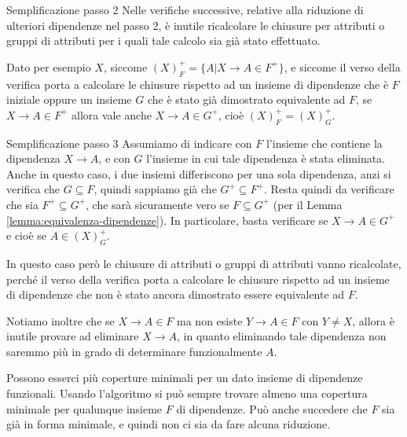 \begin{Osservation}{Semplificazione passo 2}{}
    Nelle verifiche successive, relative alla riduzione di ulteriori dipendenze nel passo 2, è inutile ricalcolare le chiusure per attributi o gruppi di attributi per i quali tale calcolo sia già stato effettuato.

    Dato per esempio $X$, siccome $(X)^+_F = \{ A | X\to A \in F^+\}$, e siccome il verso della verifica porta a calcolare le chiusure rispetto ad un insieme di dipendenze che è $F$ iniziale oppure un insieme $G$ che è stato già dimostrato equivalente ad $F$, se $X \to A\in F^+$ allora vale anche $X\to A\in G^+$, cioè $(X)^+_F = (X)^+_G$.
\end{Osservation}

\begin{Osservation}{Semplificazione passo 3}{}
    Assumiamo di indicare con $F$ l'insieme che contiene la dipendenza $X\to A$, e con $G$ l'insieme in cui tale dipendenza è stata eliminata. Anche in questo caso, i due insiemi differiscono per una sola dipendenza, anzi si verifica che $G\subseteq F$, quindi sappiamo già che $G^+\subseteq F^+$. Resta quindi da verificare che sia $F^+\subseteq G^+$, che sarà sicuramente vero se $F\subseteq G^+$ (per il Lemma \ref{lemma:equivalenza-dipendenze}). In particolare, basta verificare se $X\to A\in G^+$ e cioè se $A\in (X)^+_G$.

    In questo caso però le chiusure di attributi o gruppi di attributi vanno ricalcolate, perché il verso della verifica porta a calcolare le chiusure rispetto ad un insieme di dipendenze che non è stato ancora dimostrato essere equivalente ad $F$.

    Notiamo inoltre che se $X\to A\in F$ ma non esiste $Y\to A\in F$ con $Y\neq X$, allora è inutile provare ad eliminare $X \to A$, in quanto eliminando tale dipendenza non saremmo più in grado di determinare funzionalmente $A$.
\end{Osservation}

Possono esserci più coperture minimali per un dato insieme di dipendenze funzionali. Usando l'algoritmo si può sempre trovare almeno una copertura minimale per qualunque insieme $F$ di dipendenze. Può anche succedere che $F$ sia già in forma minimale, e quindi non ci sia da fare alcuna riduzione.

